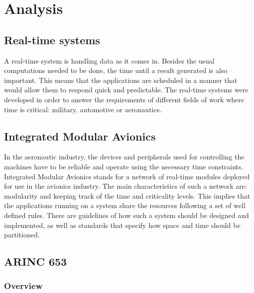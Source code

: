 
\chapter{Analysis}


\section{Real-time systems}

A real-time system is handling data as it comes in. Besides the usual computations needed to be done, 
the time until a result generated is also important. 
This means that the applications are scheduled in a manner that would allow them to respond quick and predictable. 
The real-time systems were developed in order to answer the requirements of different fields of work where time is critical: military, automotive or aeronautics.

\section{Integrated Modular Avionics}

In the aeronautic industry, the devices and peripherals used for controlling the machines have to be reliable and operate using the necessary time constraints. Integrated Modular Avionics stands for 
a network of real-time modules deployed for use in the avionics industry. 
The main characteristics of such a network are: modularity and keeping track of the time and criticality levels. 
This implies that the applications running on a system share the resources following a set of well defined rules. 
There are guidelines of how such a system should be designed and implemented, 
as well as standards that specify how space and time should be partitioned.

\section{ARINC 653}
\subsection{Overview}


